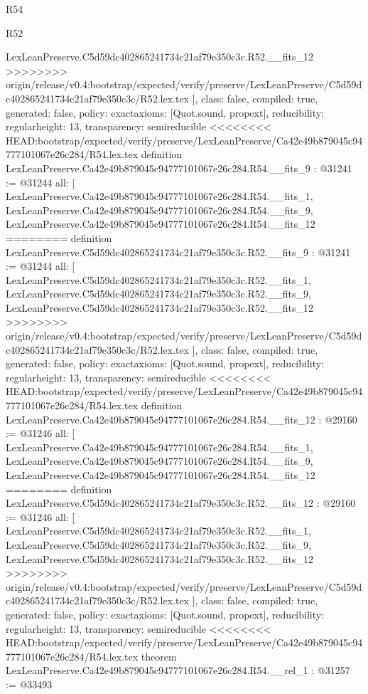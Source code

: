 \begin{lexlean}{R54}
\begin{lexlean}{R52}
\begin{coremodule}
{{{{{{{{{{{{{{{{{{{{{{{{{{{{{{{{{{{{{{{{{{{{{{{{{{{{{{{{{{{{{{{{{{{{{{{{{{{{{{{{{{{{{{{{{{{{{{{{{{{{{{{{{{{{{{{{{{{{{{{{{{{{{{{{{{{{{{{{{{{{{{{{{{{{{{    LexLeanPreserve.C5d59dc402865241734c21af79e350c3c.R52.__fits_12
>>>>>>>> origin/release/v0.4:bootstrap/expected/verify/preserve/LexLeanPreserve/C5d59dc402865241734c21af79e350c3c/R52.lex.tex
  ],
  class: false,
  compiled: true,
  generated: false,
  policy: exact{axioms: [Quot.sound, propext]},
  reducibility: regular{height: 13},
  transparency: semireducible
}
<<<<<<<< HEAD:bootstrap/expected/verify/preserve/LexLeanPreserve/Ca42e49b879045c94777101067e26c284/R54.lex.tex
definition LexLeanPreserve.Ca42e49b879045c94777101067e26c284.R54.__fits_9 : @31241 := @31244 {
  all: [
    LexLeanPreserve.Ca42e49b879045c94777101067e26c284.R54.__fits_1,
    LexLeanPreserve.Ca42e49b879045c94777101067e26c284.R54.__fits_9,
    LexLeanPreserve.Ca42e49b879045c94777101067e26c284.R54.__fits_12
========
definition LexLeanPreserve.C5d59dc402865241734c21af79e350c3c.R52.__fits_9 : @31241 := @31244 {
  all: [
    LexLeanPreserve.C5d59dc402865241734c21af79e350c3c.R52.__fits_1,
    LexLeanPreserve.C5d59dc402865241734c21af79e350c3c.R52.__fits_9,
    LexLeanPreserve.C5d59dc402865241734c21af79e350c3c.R52.__fits_12
>>>>>>>> origin/release/v0.4:bootstrap/expected/verify/preserve/LexLeanPreserve/C5d59dc402865241734c21af79e350c3c/R52.lex.tex
  ],
  class: false,
  compiled: true,
  generated: false,
  policy: exact{axioms: [Quot.sound, propext]},
  reducibility: regular{height: 13},
  transparency: semireducible
}
<<<<<<<< HEAD:bootstrap/expected/verify/preserve/LexLeanPreserve/Ca42e49b879045c94777101067e26c284/R54.lex.tex
definition LexLeanPreserve.Ca42e49b879045c94777101067e26c284.R54.__fits_12 : @29160 := @31246 {
  all: [
    LexLeanPreserve.Ca42e49b879045c94777101067e26c284.R54.__fits_1,
    LexLeanPreserve.Ca42e49b879045c94777101067e26c284.R54.__fits_9,
    LexLeanPreserve.Ca42e49b879045c94777101067e26c284.R54.__fits_12
========
definition LexLeanPreserve.C5d59dc402865241734c21af79e350c3c.R52.__fits_12 : @29160 := @31246 {
  all: [
    LexLeanPreserve.C5d59dc402865241734c21af79e350c3c.R52.__fits_1,
    LexLeanPreserve.C5d59dc402865241734c21af79e350c3c.R52.__fits_9,
    LexLeanPreserve.C5d59dc402865241734c21af79e350c3c.R52.__fits_12
>>>>>>>> origin/release/v0.4:bootstrap/expected/verify/preserve/LexLeanPreserve/C5d59dc402865241734c21af79e350c3c/R52.lex.tex
  ],
  class: false,
  compiled: true,
  generated: false,
  policy: exact{axioms: [Quot.sound, propext]},
  reducibility: regular{height: 13},
  transparency: semireducible
}
<<<<<<<< HEAD:bootstrap/expected/verify/preserve/LexLeanPreserve/Ca42e49b879045c94777101067e26c284/R54.lex.tex
theorem LexLeanPreserve.Ca42e49b879045c94777101067e26c284.R54.__rel_1 : @31257 := @33493 {
}}}}}}}}}}}}}}}}}}}}}}}}}}}}}}}}}}}}}}}}}}}}}}}}}}}}}}}}}}}}}}}}}}}}}}}}}}}}}}}}}}}}}}}}}}}}}}}}}}}}}}}}}}}}}}}}}}}}}}}}}}}}}}}}}}}}}}}}}}}}}}}}}}}}}}}}
\end{coremodule}
\end{lexlean}
\end{lexlean}
